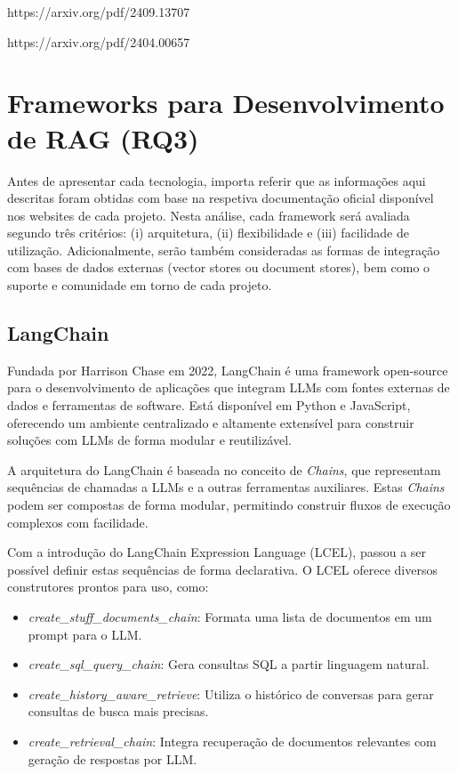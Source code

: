 https://arxiv.org/pdf/2409.13707

https://arxiv.org/pdf/2404.00657




\section{Frameworks para Desenvolvimento de RAG (RQ3)}

Antes de apresentar cada tecnologia, importa referir que as informações aqui descritas foram obtidas com base na respetiva documentação oficial disponível nos websites de cada projeto. Nesta análise, cada framework será avaliada segundo três critérios: (i) arquitetura, (ii) flexibilidade e (iii) facilidade de utilização. Adicionalmente, serão também consideradas as formas de integração com bases de dados externas (vector stores ou document stores), bem como o suporte e comunidade em torno de cada projeto.


\subsection{LangChain}


Fundada por Harrison Chase em 2022, LangChain é uma framework open-source para o desenvolvimento de aplicações que integram LLMs com fontes externas de dados e ferramentas de software. Está disponível em Python e JavaScript, oferecendo um ambiente centralizado e altamente extensível para construir soluções com LLMs de forma modular e reutilizável.


A arquitetura do LangChain é baseada no conceito de \textit{Chains}, que representam sequências de chamadas a LLMs e a outras ferramentas auxiliares. Estas \textit{Chains} podem ser compostas de forma modular, permitindo construir fluxos de execução complexos com facilidade.

Com a introdução do LangChain Expression Language (LCEL), passou a ser possível definir estas sequências de forma declarativa. O LCEL oferece diversos construtores prontos para uso, como:

\begin{itemize}
	\item \textit{create\_stuff\_documents\_chain}: Formata uma lista de documentos em um prompt para o LLM.
	\item \textit{create\_sql\_query\_chain}: Gera consultas SQL a partir linguagem natural.
	\item \textit{create\_history\_aware\_retrieve}: Utiliza o histórico de conversas para gerar consultas de busca mais precisas.
	\item \textit{create\_retrieval\_chain}: Integra recuperação de documentos relevantes com geração de respostas por LLM.
\end{itemize}

